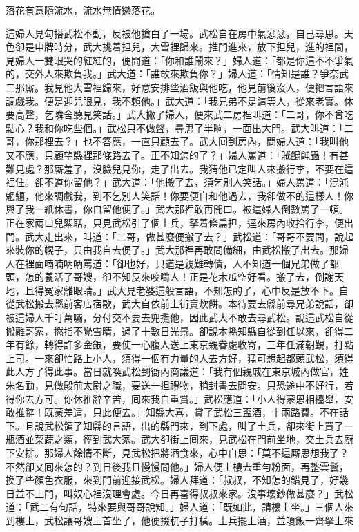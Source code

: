 \begin{myquote}
落花有意隨流水，流水無情戀落花。
\end{myquote}

這婦人見勾搭武松不動，反被他搶白了一場。武松自在房中氣忿忿，自己尋思。天色卻是申牌時分，武大挑着担兒，大雪裡歸來。推門進來，放下担兒，進的裡間，見婦人一雙眼哭的紅紅的，便問道：「你和誰鬧來？」婦人道：「都是你這不不爭氣的，交外人來欺負我。」武大道：「誰敢來欺負你？」婦人道：「情知是誰？爭奈武二那厮。我見他大雪裡歸來，好意安排些酒飯與他吃，他見前後沒人，便把言語來調戲我。便是迎兒眼見，我不賴他。」武大道：「我兄弟不是這等人，從來老實。休要高聲，乞隣舍聽見笑話。」{}武大撇了婦人，便來武二房裡叫道：「二哥，你不曾吃點心？我和你吃些個。」武松只不做聲，尋思了半晌，一面出大門。武大叫道：「二哥，你那裡去？」也不答應，一直只顧去了。武大囘到房內，問婦人道：「我叫他又不應，只顧望縣裡那條路去了。正不知怎的了？」婦人罵道：「賊餛飩蟲！有甚難見處？那厮羞了，沒臉兒見你，{}走了出去。我猜他已定叫人來搬行李，不要在這裡住。卻不道你留他？」武大道：「他搬了去，須乞別人笑話。」婦人罵道：「混沌魍魎，他來調戲我，到不乞別人笑話！你要便自和他過去，我卻做不的這樣人！你與了我一紙休書，你自留他便了。」武大那裡敢再開口。被這婦人倒數罵了一頓。正在家兩口兒絮聒，只見武松引了個土兵，拏着條扁担，逕來房內收拾行李，便出門。武大走出來，叫道：「二哥，做甚麼便搬了去？」武松道：「哥哥不要問，說起來裝你的幌子，只由我自去便了。」武大那裡再敢問備細，由武松搬了出去。那婦人在裡面喃喃吶吶罵道：「卻也好，只道是親難轉債，人不知道一個兄弟做了都頭，怎的養活了哥嫂，卻不知反來咬嚼人！{}正是花木瓜空好看。搬了去，倒謝天地，且得冤家離眼睛。」{}武大見老婆這般言語，不知怎的了，心中反是放不下。自從武松搬去縣前客店宿歇，武大自依前上街賣炊餅。本待要去縣前尋兄弟說話，卻被這婦人千叮萬囑，分付交不要去兜攬他，因此武大不敢去尋武松。說這武松自從搬離哥家，撚指不覺雪晴，過了十數日光景。卻說本縣知縣自從到任以來，卻得二年有餘，轉得許多金銀，{}要使一心腹人送上東京親眷處收寄，三年任滿朝覲，打點上司。一來卻怕路上小人，須得一個有力量的人去方好，猛可想起都頭武松，須得此人方了得此事。當日就喚武松到衙內商議道：「我有個親戚在東京城內做官，姓朱名勔，見做殿前太尉之職，要送一担禮物，稍封書去問安。只恐途中不好行，若得你去方可。你休推辭辛苦，囘來我自重賞。」武松應道：「小人得蒙恩相擡舉，安敢推辭！既蒙差遣，只此便去。」知縣大喜，賞了武松三盃酒，十兩路費。不在話下。且說武松領了知縣的言語，出的縣門來，到下處，叫了土兵，卻來街上買了一瓶酒並菜蔬之類，徑到武大家。武大卻街上囘來，見武松在門前坐地，交土兵去廚下安排。那婦人餘情不斷，見武松把將酒食來，心中自思：「莫不這厮思想我了？不然卻又囘來怎的？到日後我且慢慢問他。」婦人便上樓去重勻粉面，再整雲鬟，換了些顏色衣服，來到門前迎接武松。婦人拜道：「叔叔，不知怎的錯見了，好幾日並不上門，叫奴心裡沒理會處。今日再喜得叔叔來家。沒事壞鈔做甚麼？」武松道：「武二有句話，特來要與哥哥說知。」婦人道：「既如此，請樓上坐。」三個人來到樓上，武松讓哥嫂上首坐了，他便掇杌子打橫。土兵擺上酒，並嗄飯一齊拏上來